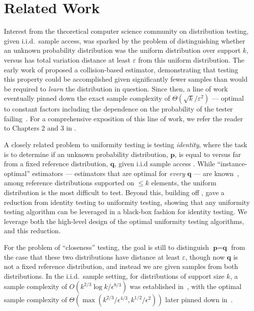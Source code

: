 \documentclass[10pt]{article} %
\def\eps{{\varepsilon}}
\theoremstyle{plain}
\newcommand{\bp}{\textbf{p}}
\newcommand{\bq}{\textbf{q}}
\begin{document}
\section{Related Work}
\label{sec:related}







Interest from the theoretical computer science community on distribution testing, given i.i.d.\ sample access, was sparked by the problem of distinguishing whether an unknown probability distribution was the uniform distribution over support $k$, versus has  total variation distance at least $\eps$ from this uniform distribution. The early work of \cite{goldreich2011testing} proposed a  collision-based estimator, demonstrating that testing this property could be accomplished given significantly fewer samples than would be required to \textit{learn} the distribution in question. %
Since then, a line of work eventually pinned down the exact sample complexity of $\Theta(\sqrt{k}/\eps^2)$ --- optimal to constant factors including the dependence on the probability of the tester failing~\citep{paninski2008coincidence, valiant2017automatic, diakonikolas2014testing, diakonikolas2016collision,diakonikolas2017optimal}.     For a comprehensive exposition of this line of work, we refer the reader to Chapters 2 and 3 in \cite{clement-tb}.


A closely related problem to uniformity testing is testing \textit{identity}, where the task is to determine if an unknown probability distribution, $\bp$, is equal to versus far from a fixed reference distribution, $\bq$, given i.i.d sample access \citep{batu2001testing}.  While ``instance-optimal'' estimators --- estimators that are optimal for \emph{every} $\bq$ --- are known~\citep{valiant2017automatic}, among reference distributions supported on $\le k$ elements, the uniform distribution is the most difficult to test.  Beyond this, building off \cite{diakonikolas2016new}, \cite{goldreich2016uniform} gave a reduction from identity testing to uniformity testing, showing that any uniformity testing algorithm can be leveraged in a black-box fashion for identity testing.  We leverage both the high-level design of the optimal uniformity testing algorithms, and this reduction.  

For the problem of ``closeness'' testing, the goal is still to distinguish $\bp = \bq$ from the case that these two distributions have distance at least $\eps$, though now $\bq$ is not a fixed reference distribution, and instead we are given samples from both distributions.  In the i.i.d.\ sample setting, for distributions of support size $k$, a sample complexity of $O(k^{2/3}\log k/\epsilon^{8/3})$ was established in~\cite{batu2001testing,batu2013testing}, with the optimal sample complexity of $\Theta(\max(k^{2/3}/\epsilon^{4/3}, k^{1/2}/\epsilon^2))$ later pinned down in~\cite{chan2014optimal}.
\end{document}
